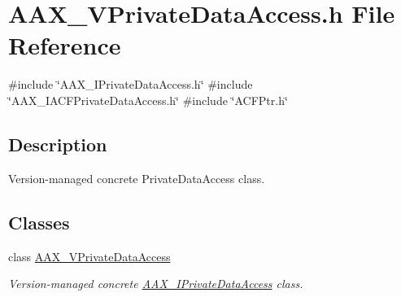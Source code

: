 \hypertarget{a00722}{}\section{A\+A\+X\+\_\+\+V\+Private\+Data\+Access.\+h File Reference}
\label{a00722}
{\ttfamily \#include \char`\"{}A\+A\+X\+\_\+\+I\+Private\+Data\+Access.\+h\char`\"{}}\newline
{\ttfamily \#include \char`\"{}A\+A\+X\+\_\+\+I\+A\+C\+F\+Private\+Data\+Access.\+h\char`\"{}}\newline
{\ttfamily \#include \char`\"{}A\+C\+F\+Ptr.\+h\char`\"{}}\newline


\subsection{Description}
Version-\/managed concrete Private\+Data\+Access class. 

\subsection*{Classes}
\begin{DoxyCompactItemize}
\item 
class \mbox{\hyperlink{a01933}{A\+A\+X\+\_\+\+V\+Private\+Data\+Access}}
\begin{DoxyCompactList}\small\item\em Version-\/managed concrete \mbox{\hyperlink{a01865}{A\+A\+X\+\_\+\+I\+Private\+Data\+Access}} class. \end{DoxyCompactList}\end{DoxyCompactItemize}
